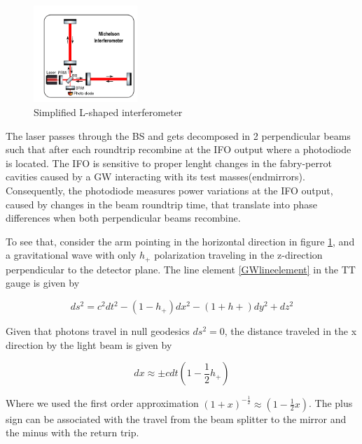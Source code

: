 \begin{figure}[hbt!]
\begin{center}
\includegraphics[width=0.35\textwidth, angle=0]{images/IFO.png}
\captionsetup{width=0.8\textwidth}
\caption{Simplified L-shaped interferometer}
\label{IFO}
\end{center}
\end{figure}

\FloatBarrier

The laser passes through the BS and gets decomposed in 2 perpendicular beams such that after each roundtrip recombine at the IFO output where a photodiode is located. The IFO is sensitive to proper lenght changes in the fabry-perrot cavities caused by a GW interacting with its test masses(endmirrors). Consequently, the photodiode measures power variations at the IFO output, caused by changes in the beam roundtrip time, that translate into phase differences when both perpendicular beams recombine.

To see that, consider the arm pointing in the horizontal direction in figure \ref{IFO}, and a gravitational wave with only $h_+$  polarization traveling in the z-direction perpendicular to the detector plane. The line element \ref{GWlineelement} in the TT gauge is given by

\begin{equation}
ds^2 = c^2 dt^2 - (1-h_+) dx^2 - (1+h+) dy^2 + dz^2
\end{equation}

Given that photons travel in null geodesics $ds^2 = 0$, the distance traveled in the x direction by the light beam is given by

\begin{equation}\label{dx}
dx \approx \pm cdt \left(  1-\frac{1}{2} h_+ \right)
\end{equation}

Where we used the first order approximation $(1+x)^{-\frac{1}{2}} \approx (1 - \frac{1}{2} x)$. The plus sign can be associated with the travel from the beam splitter to the mirror and the minus with the return trip. 

